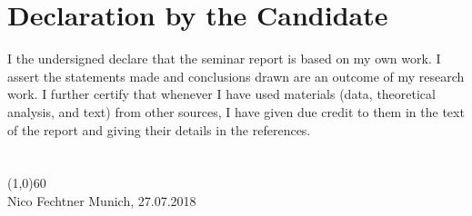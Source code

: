 \documentclass[runningheads,a4paper]{llncs}
\begin{document}
\newpage

{}


\newpage

\section*{Declaration by the Candidate}
I the undersigned declare that the seminar report is based on my own work.
I assert the statements made and conclusions drawn are an outcome of my research work. I further certify that whenever I have used materials (data, theoretical analysis, and text) from other sources, I have given due credit to them in the text of the report and giving their details in the references.
\\ \\ \\
\line(1,0){60}\\
Nico Fechtner
\hfill
Munich, 27.07.2018
\end{document}
